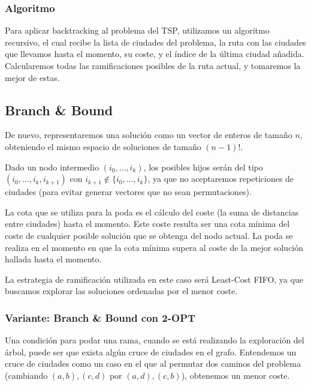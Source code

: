 \documentclass[a4paper, 11pt]{article} %
\begin{document}
    \newpage
    
    \subsubsection{Algoritmo}
    
    Para aplicar backtracking al problema del TSP, utilizamos un algoritmo recursivo, el cual recibe la lista de 
    ciudades del problema, la ruta con las ciudades que llevamos hasta el momento, su coste, y el índice de la 
    última ciudad añadida. Calcularemos todas las ramificaciones posibles de la ruta actual, y tomaremos la mejor 
    de estas. 
    
    
    \small
    \texttt{}
    \normalsize
    
    \subsection{Branch \& Bound}
      De nuevo, representaremos una solución como un vector de enteros de tamaño $n$, obteniendo el mismo espacio de soluciones de tamaño $(n-1)!$.
      
      Dado un nodo intermedio $(i_0, \dots, i_k)$, los posibles hijos serán del tipo\\ $(i_0, \dots, i_k, i_{k+1})$ con $i_{k+1} \notin \{i_0, \dots, i_k\}$, 
      ya que no aceptaremos repeticiones de ciudades (para evitar generar vectores que no sean permutaciones).
      
      La cota que se utiliza para la poda es el cálculo del coste (la suma de distancias entre ciudades) hasta el momento. Este coste resulta ser una cota 
      mínima del coste de cualquier posible solución que se obtenga del nodo actual.
      La poda se realiza en el momento en que la cota mínima supera al coste de la mejor solución hallada hasta el momento.
      
      La estrategia de ramificación utilizada en este caso será Least-Cost FIFO, ya que buscamos explorar las soluciones ordenadas por el menor coste.
      
      \subsubsection{Variante: Branch \& Bound con 2-OPT}
	Una condición para podar una rama, cuando se está realizando la exploración del árbol, puede ser que exista algún cruce de ciudades en el grafo.
	Entendemos un cruce de ciudades como un caso en el que al permutar dos caminos del problema (cambiando $(a,b),(c,d)$ por $(a,d),(c,b)$), obtenemos
	un menor coste.
	
\end{document}
